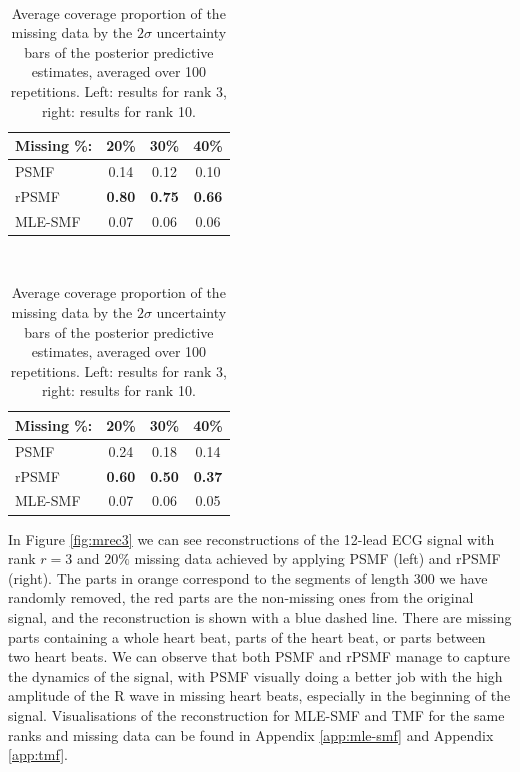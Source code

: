 \documentclass{mldsmsc}
\begin{document}
\begin{table}[H]
    \centering
    \begin{minipage}{0.45\textwidth}
        \centering
         \\[0.5ex]
        \begin{threeparttable}
            \begin{tabular}{lccc}
                \hline
                Missing \%: & 20\% & 30\% & 40\% \\
                \hline
                PSMF & 0.14 & 0.12 & 0.10 \\
                rPSMF & \textbf{0.80} & \textbf{0.75} & \textbf{0.66} \\
                MLE-SMF & 0.07 & 0.06 & 0.06 \\
                \hline
            \end{tabular}
        \end{threeparttable}
    \end{minipage}%
    \hspace{0.1\textwidth}%
    \begin{minipage}{0.45\textwidth}
        \centering
         \\[0.5ex]
        \begin{threeparttable}
            \begin{tabular}{lccc}
                \hline
                Missing \%: & 20\% & 30\% & 40\% \\
                \hline
                PSMF & 0.24 & 0.18 & 0.14 \\
                rPSMF & \textbf{0.60} & \textbf{0.50} & \textbf{0.37} \\
                MLE-SMF & 0.07 & 0.06 & 0.05 \\
                \hline
            \end{tabular}
        \end{threeparttable}
    \end{minipage}
    \caption{Average coverage proportion of the missing data by the $2\sigma$ uncertainty bars of the posterior predictive estimates, averaged over 100 repetitions. Left: results for rank 3, right: results for rank 10.}
    \label{tab:coverage}
\end{table}

\noindent In Figure \ref{fig:mrec3} we can see reconstructions of the 12-lead ECG signal with rank $r = 3$ and $20\%$ missing data achieved by applying PSMF (left) and rPSMF (right). The parts in orange correspond to the segments of length $300$ we have randomly removed, the red parts are the non-missing ones from the original signal, and the reconstruction is shown with a blue dashed line. There are missing parts containing a whole heart beat, parts of the heart beat, or parts between two heart beats. We can observe that both PSMF and rPSMF manage to capture the dynamics of the signal, with PSMF visually doing a better job with the high amplitude of the R wave in missing heart beats, especially in the beginning of the signal. Visualisations of the reconstruction for MLE-SMF and TMF for the same ranks and missing data can be found in Appendix \ref{app:mle-smf} and Appendix \ref{app:tmf}.
\end{document}

